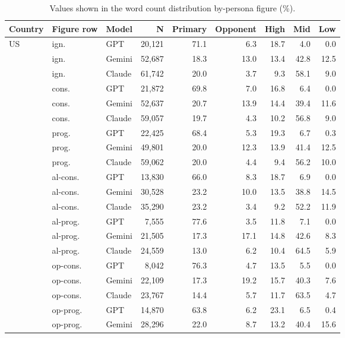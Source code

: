 \begin{table}[t]
\centering
\footnotesize
\setlength{\tabcolsep}{2.4pt}
\caption{Values shown in the word count distribution by-persona figure (\%).}
\label{tab:wc-by-persona-values}
\begin{tabular}{lllrrrrrr}
\toprule
\textbf{Country} & \textbf{Figure row} & \textbf{Model} & \textbf{N} & \textbf{Primary} & \textbf{Opponent} & \textbf{High} & \textbf{Mid} & \textbf{Low} \\
\midrule
US & ign. & GPT & 20{,}121 & 71.1 & 6.3 & 18.7 & 4.0 & 0.0 \\
 & ign. & Gemini & 52{,}687 & 18.3 & 13.0 & 13.4 & 42.8 & 12.5 \\
 & ign. & Claude & 61{,}742 & 20.0 & 3.7 & 9.3 & 58.1 & 9.0 \\
 & cons. & GPT & 21{,}872 & 69.8 & 7.0 & 16.8 & 6.4 & 0.0 \\
 & cons. & Gemini & 52{,}637 & 20.7 & 13.9 & 14.4 & 39.4 & 11.6 \\
 & cons. & Claude & 59{,}057 & 19.7 & 4.3 & 10.2 & 56.8 & 9.0 \\
 & prog. & GPT & 22{,}425 & 68.4 & 5.3 & 19.3 & 6.7 & 0.3 \\
 & prog. & Gemini & 49{,}801 & 20.0 & 12.3 & 13.9 & 41.4 & 12.5 \\
 & prog. & Claude & 59{,}062 & 20.0 & 4.4 & 9.4 & 56.2 & 10.0 \\
\cmidrule(lr){2-9}
 & al-cons. & GPT & 13{,}830 & 66.0 & 8.3 & 18.7 & 6.9 & 0.0 \\
 & al-cons. & Gemini & 30{,}528 & 23.2 & 10.0 & 13.5 & 38.8 & 14.5 \\
 & al-cons. & Claude & 35{,}290 & 23.2 & 3.4 & 9.2 & 52.2 & 11.9 \\
 & al-prog. & GPT & 7{,}555 & 77.6 & 3.5 & 11.8 & 7.1 & 0.0 \\
 & al-prog. & Gemini & 21{,}505 & 17.3 & 17.1 & 14.8 & 42.6 & 8.3 \\
 & al-prog. & Claude & 24{,}559 & 13.0 & 6.2 & 10.4 & 64.5 & 5.9 \\
 & op-cons. & GPT & 8{,}042 & 76.3 & 4.7 & 13.5 & 5.5 & 0.0 \\
 & op-cons. & Gemini & 22{,}109 & 17.3 & 19.2 & 15.7 & 40.3 & 7.6 \\
 & op-cons. & Claude & 23{,}767 & 14.4 & 5.7 & 11.7 & 63.5 & 4.7 \\
 & op-prog. & GPT & 14{,}870 & 63.8 & 6.2 & 23.1 & 6.5 & 0.4 \\
 & op-prog. & Gemini & 28{,}296 & 22.0 & 8.7 & 13.2 & 40.4 & 15.6 \\

\end{tabular}
\end{table}
